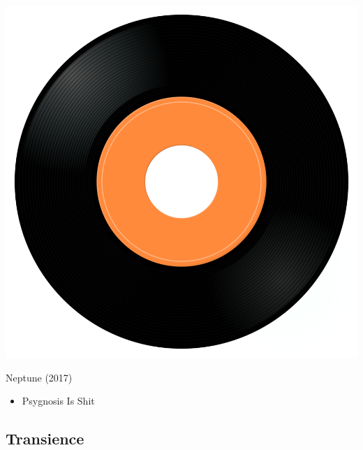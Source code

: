 \begin{minipage}[t]{0.25\textwidth}\vspace{0pt}
\captionsetup{type=figure}
\includegraphics[width=\textwidth]{Images/cover.png}
\caption*{Neptune (2017)}
\end{minipage}
\begin{minipage}[t]{0.25\textwidth}\vspace{0pt}
\begin{itemize}[nosep,leftmargin=1em,labelwidth=*,align=left]
	\setlength{\itemsep}{0pt}
	\item Psygnosis Is Shit
\end{itemize}
\end{minipage}

\subsection{Transience}

